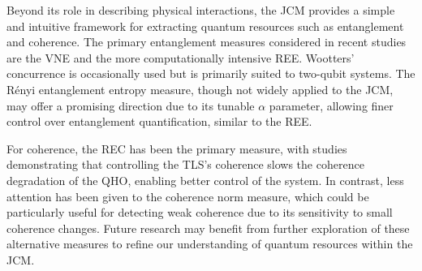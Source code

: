 \documentclass[12pt,a4paper]{article}
\begin{document}
Beyond its role in describing physical interactions, the JCM provides a simple and intuitive framework for extracting quantum resources such as entanglement and coherence. The primary entanglement measures considered in recent studies are the VNE and the more computationally intensive REE. Wootters' concurrence is occasionally used but is primarily suited to two-qubit systems. The R\'enyi entanglement entropy measure, though not widely applied to the JCM, may offer a promising direction due to its tunable $\alpha$ parameter, allowing finer control over entanglement quantification, similar to the REE.

For coherence, the REC has been the primary measure, with studies demonstrating that controlling the TLS's coherence slows the coherence degradation of the QHO, enabling better control of the system. In contrast, less attention has been given to the coherence norm measure, which could be particularly useful for detecting weak coherence due to its sensitivity to small coherence changes. Future research may benefit from further exploration of these alternative measures to refine our understanding of quantum resources within the JCM.


\newpage

 
 
\end{document}
